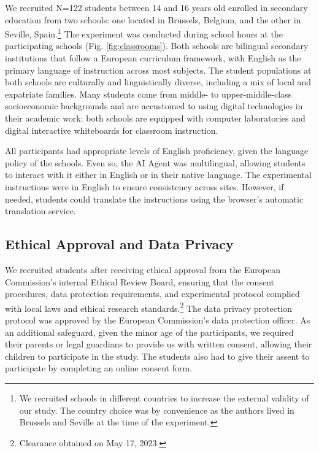 \documentclass[
  12pt,
]{article}
\begin{document}
We recruited N=122 students between 14 and 16 years old enrolled in secondary education from two schools: one located in Brussels, Belgium, and the other in Seville, Spain.\footnote{We recruited schools in different countries to increase the external validity of our study. The country choice was by convenience as the authors lived in Brussels and Seville at the time of the experiment.} The experiment was conducted during school hours at the participating schools (Fig. \ref{fig:classrooms}). Both schools are bilingual secondary institutions that follow a European curriculum framework, with English as the primary language of instruction across most subjects. The student populations at both schools are culturally and linguistically diverse, including a mix of local and expatriate families. Many students come from middle- to upper-middle-class socioeconomic backgrounds and are accustomed to using digital technologies in their academic work: both schools are equipped with computer laboratories and digital interactive whiteboards for classroom instruction.

All participants had appropriate levels of English proficiency, given the language policy of the schools. Even so, the AI Agent was multilingual, allowing students to interact with it either in English or in their native language. The experimental instructions were in English to ensure consistency across sites. However, if needed, students could translate the instructions using the browser's automatic translation service.

\subsection{Ethical Approval and Data Privacy}\label{ethical-approval-and-data-privacy}

We recruited students after receiving ethical approval from the European Commission's internal Ethical Review Board, ensuring that the consent procedures, data protection requirements, and experimental protocol complied with local laws and ethical research standards.\footnote{Clearance obtained on May 17, 2023.} The data privacy protection protocol was approved by the European Commission's data protection officer. As an additional safeguard, given the minor age of the participants, we required their parents or legal guardians to provide us with written consent, allowing their children to participate in the study. The students also had to give their assent to participate by completing an online consent form.
\end{document}
